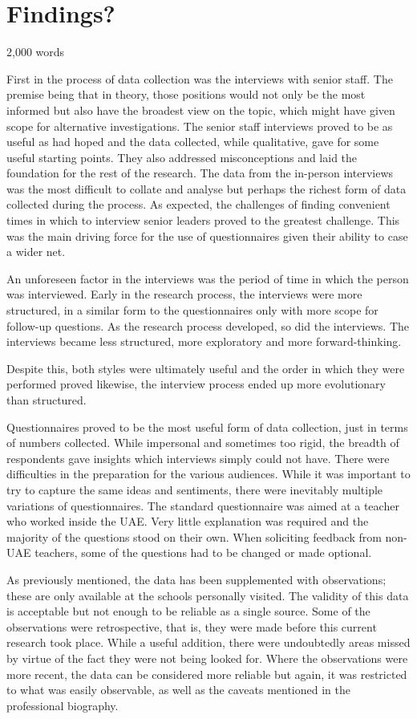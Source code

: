 \section{Findings?}
2,000 words 

First in the process of data collection was the interviews with senior staff. The premise being that in theory, those positions would not only be the most informed but also have the broadest view on the topic, which might have given scope for alternative investigations. The senior staff interviews proved to be as useful as had hoped and the data collected, while qualitative, gave for some useful starting points. They also addressed misconceptions and laid the foundation for the rest of the research. The data from the in-person interviews was the most difficult to collate and analyse but perhaps the richest form of data collected during the process. As expected, the challenges of finding convenient times in which to interview senior leaders proved to the greatest challenge. This was the main driving force for the use of questionnaires given their ability to case a wider net. 

An unforeseen factor in the interviews was the period of time in which the person was interviewed. Early in the research process, the interviews were more structured, in a similar form to the questionnaires only with more scope for follow-up questions. As the research process developed, so did the interviews. The interviews became less structured, more exploratory and more forward-thinking.

Despite this, both styles were ultimately useful and the order in which they were performed proved likewise, the interview process ended up more evolutionary than structured.

Questionnaires proved to be the most useful form of data collection, just in terms of numbers collected. While impersonal and sometimes too rigid, the breadth of respondents gave insights which interviews simply could not have. There were difficulties in the preparation for the various audiences. While it was important to try to capture the same ideas and sentiments, there were inevitably multiple variations of questionnaires. The standard questionnaire was aimed at a teacher who worked inside the UAE. Very little explanation was required and the majority of the questions stood on their own. When soliciting feedback from non-UAE teachers, some of the questions had to be changed or made optional. 

As previously mentioned, the data has been supplemented with observations; these are only available at the schools personally visited. The validity of this data is acceptable but not enough to be reliable as a single source. Some of the observations were retrospective, that is, they were made before this current research took place. While a useful addition, there were undoubtedly areas missed by virtue of the fact they were not being looked for. Where the observations were more recent, the data can be considered more reliable but again, it was restricted to what was easily observable, as well as the caveats mentioned in the professional biography.

